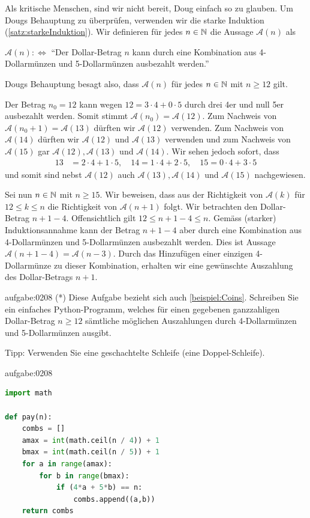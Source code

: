 {Als kritische Menschen, sind wir nicht bereit, Doug einfach so zu glauben. Um Dougs Behauptung zu überprüfen, verwenden wir die starke Induktion (\cref{satz:starkeInduktion}). Wir definieren für jedes $n\in\mathbb{N}$ die Aussage $\mathcal{A}(n)$ als
\begin{center}
    $\mathcal{A}(n) :\iff $ \enquote{Der Dollar-Betrag $n$ kann durch eine Kombination aus 4-Dollarmünzen und 5-Dollarmünzen ausbezahlt werden.}
\end{center}
Dougs Behauptung besagt also, dass $\mathcal{A}(n)$ für jedes $n\in\mathbb{N}$ mit $n\geq 12$ gilt.

Der Betrag $n_0 = 12$ kann wegen $12 = 3\cdot 4 + 0\cdot 5$ durch drei 4er und null 5er ausbezahlt werden. Somit stimmt $\mathcal{A}(n_0)=\mathcal{A}(12)$. Zum Nachweis von $\mathcal{A}(n_0+1)=\mathcal{A}(13)$ dürften wir $\mathcal{A}(12)$ verwenden. Zum Nachweis von $\mathcal{A}(14)$ dürften wir $\mathcal{A}(12)$ und $\mathcal{A}(13)$ verwenden und zum Nachweis von $\mathcal{A}(15)$ gar $\mathcal{A}(12), \mathcal{A}(13)$ und $\mathcal{A}(14)$. Wir sehen jedoch sofort, dass
\begin{align*}
    13 &= 2\cdot 4 + 1\cdot 5, \quad 14 = 1\cdot 4 + 2\cdot 5, \quad 15 = 0\cdot 4 + 3\cdot 5
\end{align*}
und somit sind nebst $\mathcal{A}(12)$ auch $\mathcal{A}(13), \mathcal{A}(14)$ und $\mathcal{A}(15)$ nachgewiesen.

Sei nun $n\in\mathbb{N}$ mit $n\geq 15$. Wir beweisen, dass aus der Richtigkeit von $\mathcal{A}(k)$ für $12\leq k \leq n$ die Richtigkeit von $\mathcal{A}(n+1)$ folgt. Wir betrachten den Dollar-Betrag $n+1-4$. Offensichtlich gilt $12\leq n+1-4\leq n$. Gemäss (starker) Induktionsannahme kann der Betrag $n+1-4$ aber durch eine Kombination aus 4-Dollarmünzen und 5-Dollarmünzen ausbezahlt werden. Dies ist Aussage $\mathcal{A}(n+1-4) = \mathcal{A}(n-3)$. Durch das Hinzufügen einer einzigen 4-Dollarmünze zu dieser Kombination, erhalten wir eine gewünschte Auszahlung des Dollar-Betrags $n+1$.
}

\begin{aufgabe}{aufgabe:0208}
(*) Diese Aufgabe bezieht sich auch \cref{beispiel:Coins}. Schreiben Sie ein einfaches Python-Programm, welches für einen gegebenen ganzzahligen Dollar-Betrag $n\geq 12$ sämtliche möglichen Auszahlungen durch 4-Dollarmünzen und 5-Dollarmünzen ausgibt.

\noindent
Tipp: Verwenden Sie eine geschachtelte Schleife (eine Doppel-Schleife).
\end{aufgabe}
\begin{antwort}{aufgabe:0208}
\begin{lstlisting}[language=Python,caption=Dollar-Betrag auszahlen]
import math

def pay(n):
    combs = []
    amax = int(math.ceil(n / 4)) + 1
    bmax = int(math.ceil(n / 5)) + 1
    for a in range(amax):
        for b in range(bmax):
            if (4*a + 5*b) == n:
                combs.append((a,b))
    return combs
\end{lstlisting}
\end{antwort}

